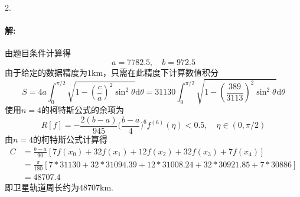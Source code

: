 \documentclass[12pt, a4paper]{article}
\theoremstyle{margin}
\newcommand{\rd}{\mathrm{d}}
\begin{document}
2. \paragraph{解:} 由题目条件计算得
\[a = 7782.5, \quad b = 972.5\]
由于给定的数据精度为$1 \mathrm{km}$，只需在此精度下计算数值积分
\[S = 4a \int_{0}^{\pi / 2} \sqrt{1 - (\frac{c}{a})^2 \sin^2{\theta}} \rd \theta = 31130 \int_{0}^{\pi / 2} \sqrt{1 - (\frac{389}{3113})^2 \sin^2{\theta}} \rd \theta\]
使用$n = 4$的柯特斯公式的余项为
\[R[f] = -\frac{2(b - a)}{945} \Big(\frac{b - a}{4}\Big)^6 f^{(6)}(\eta) < 0.5, \quad \eta \in (0, \pi / 2)\]
由$n = 4$的柯特斯公式计算得
\[\begin{split}
C & = \frac{b - a}{90}[7 f(x_0) + 32 f(x_1) + 12 f(x_2) + 32 f(x_3) + 7 f(x_4)] \\
& = \frac{\pi}{180}[7 * 31130 + 32 * 31094.39 + 12 * 31008.24 + 32 * 30921.85 + 7 * 30886] \\
& = 48707.4
\end{split}\]
即卫星轨道周长约为$48707 \mathrm{km}$.
\end{document}
